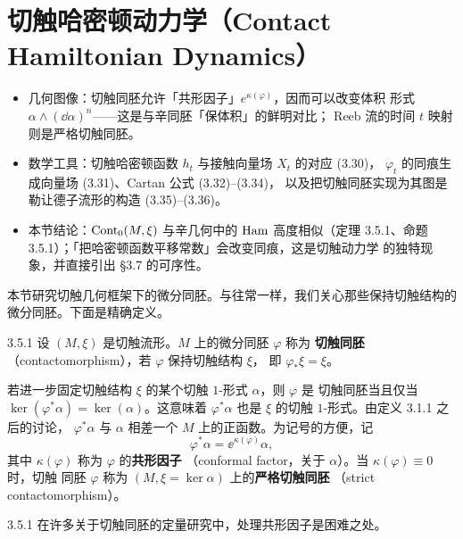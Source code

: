 \section{切触哈密顿动力学（Contact Hamiltonian Dynamics）}

\begin{keytakeaways}
\begin{itemize}
  \item 几何图像：切触同胚允许「共形因子」$e^{\kappa(\varphi)}$，因而可以改变体积
        形式 $\alpha\wedge(\dd\alpha)^n$——这是与辛同胚「保体积」的鲜明对比；
        Reeb 流的时间 $t$ 映射则是严格切触同胚。
  \item 数学工具：切触哈密顿函数 $h_t$ 与接触向量场 $X_t$ 的对应 (3.30)，
        $\varphi_t$ 的同痕生成向量场 (3.31)、Cartan 公式 (3.32)–(3.34)，
        以及把切触同胚实现为其图是勒让德子流形的构造 (3.35)–(3.36)。
  \item 本节结论：$\operatorname{Cont}_0(M,\xi)$ 与辛几何中的 $\operatorname{Ham}$ 高度相似（定理
        3.5.1、命题 3.5.1）；「把哈密顿函数平移常数」会改变同痕，这是切触动力学
        的独特现象，并直接引出 §3.7 的可序性。
\end{itemize}
\end{keytakeaways}

本节研究切触几何框架下的微分同胚。与往常一样，我们关心那些保持切触结构的
微分同胚。下面是精确定义。

\begin{wdefn}{3.5.1}
设 $(M,\xi)$ 是切触流形。$M$ 上的微分同胚 $\varphi$ 称为
\textbf{切触同胚}（contactomorphism），若 $\varphi$ 保持切触结构 $\xi$，
即 $\varphi_*\xi=\xi$。
\end{wdefn}

若进一步固定切触结构 $\xi$ 的某个切触 $1$-形式 $\alpha$，则 $\varphi$ 是
切触同胚当且仅当 $\ker(\varphi^*\alpha)=\ker(\alpha)$。这意味着
$\varphi^*\alpha$ 也是 $\xi$ 的切触 $1$-形式。由定义 3.1.1 之后的讨论，
$\varphi^*\alpha$ 与 $\alpha$ 相差一个 $M$ 上的正函数。为记号的方便，记
\begin{equation}\tag{3.29}
  \varphi^*\alpha=\ee^{\kappa(\varphi)}\alpha,
\end{equation}
其中 $\kappa(\varphi)$ 称为 $\varphi$ 的\textbf{共形因子}
（conformal factor，关于 $\alpha$）。当 $\kappa(\varphi)\equiv0$ 时，切触
同胚 $\varphi$ 称为 $(M,\xi=\ker\alpha)$ 上的\textbf{严格切触同胚}
（strict contactomorphism）。

\begin{wrem}{3.5.1}
在许多关于切触同胚的定量研究中，处理共形因子是困难之处。
\end{wrem}

